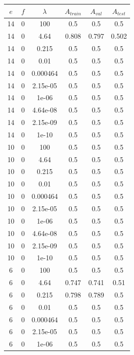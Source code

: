 \begin{itemize}
        \begin{table}[ht]
        \centering
        \begin{tabular}{ |c|c|c|c|c|c| }
        \hline
        $e$ & $f$ & $\lambda$ & $A_{train}$ & $A_{val}$ & $A_{test}$ \\
        \hline
        14 & 0 & 100 & 0.5 & 0.5 & 0.5 \\
        14 & 0 & 4.64 & 0.808 & 0.797 & 0.502 \\
        14 & 0 & 0.215 & 0.5 & 0.5 & 0.5 \\
        14 & 0 & 0.01 & 0.5 & 0.5 & 0.5 \\
        14 & 0 & 0.000464 & 0.5 & 0.5 & 0.5 \\
        14 & 0 & 2.15e-05 & 0.5 & 0.5 & 0.5 \\
        14 & 0 & 1e-06 & 0.5 & 0.5 & 0.5 \\
        14 & 0 & 4.64e-08 & 0.5 & 0.5 & 0.5 \\
        14 & 0 & 2.15e-09 & 0.5 & 0.5 & 0.5 \\
        14 & 0 & 1e-10 & 0.5 & 0.5 & 0.5 \\
        10 & 0 & 100 & 0.5 & 0.5 & 0.5 \\
        10 & 0 & 4.64 & 0.5 & 0.5 & 0.5 \\
        10 & 0 & 0.215 & 0.5 & 0.5 & 0.5 \\
        10 & 0 & 0.01 & 0.5 & 0.5 & 0.5 \\
        10 & 0 & 0.000464 & 0.5 & 0.5 & 0.5 \\
        10 & 0 & 2.15e-05 & 0.5 & 0.5 & 0.5 \\
        10 & 0 & 1e-06 & 0.5 & 0.5 & 0.5 \\
        10 & 0 & 4.64e-08 & 0.5 & 0.5 & 0.5 \\
        10 & 0 & 2.15e-09 & 0.5 & 0.5 & 0.5 \\
        10 & 0 & 1e-10 & 0.5 & 0.5 & 0.5 \\
        6 & 0 & 100 & 0.5 & 0.5 & 0.5 \\
        6 & 0 & 4.64 & 0.747 & 0.741 & 0.51 \\
        6 & 0 & 0.215 & 0.798 & 0.789 & 0.5 \\
        6 & 0 & 0.01 & 0.5 & 0.5 & 0.5 \\
        6 & 0 & 0.000464 & 0.5 & 0.5 & 0.5 \\
        6 & 0 & 2.15e-05 & 0.5 & 0.5 & 0.5 \\
        6 & 0 & 1e-06 & 0.5 & 0.5 & 0.5 \\

\end{tabular}
\end{table}
\end{itemize}
